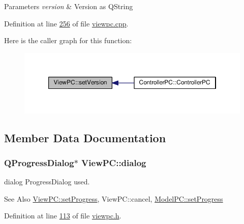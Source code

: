 \begin{DoxyParams}{Parameters}
{\em version} & Version as Q\-String \\
\hline
\end{DoxyParams}


Definition at line \hyperlink{viewpc_8cpp_source_l00256}{256} of file \hyperlink{viewpc_8cpp_source}{viewpc.\-cpp}.



Here is the caller graph for this function\-:
\nopagebreak
\begin{figure}[H]
\begin{center}
\leavevmode
\includegraphics[width=350pt]{class_view_p_c_ac05220df875b7c4f24405a5742476ebf_icgraph}
\end{center}
\end{figure}




\subsection{Member Data Documentation}
\hypertarget{class_view_p_c_a31abbb470fe329b44e6ffee202b903ca}{
\subsubsection[{dialog}]{\setlength{\rightskip}{0pt plus 5cm}Q\-Progress\-Dialog$\ast$ View\-P\-C\-::dialog}}\label{class_view_p_c_a31abbb470fe329b44e6ffee202b903ca}


dialog Progress\-Dialog used. 

\begin{DoxySeeAlso}{See Also}
\hyperlink{class_view_p_c_a9c32a1fdb6ead84e5ada8fba8860c7ed}{View\-P\-C\-::set\-Progress}, View\-P\-C\-::cancel, \hyperlink{class_model_p_c_afdcd80f0ed5062e145a71f09b0897547}{Model\-P\-C\-::set\-Progress} 
\end{DoxySeeAlso}


Definition at line \hyperlink{viewpc_8h_source_l00113}{113} of file \hyperlink{viewpc_8h_source}{viewpc.\-h}.

